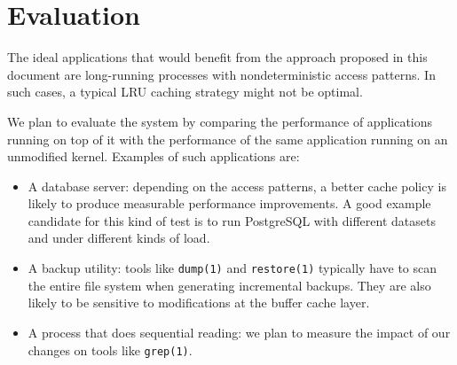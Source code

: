 \section{Evaluation}

The ideal applications that would benefit from the approach proposed in this document
are long-running processes with nondeterministic access patterns. In such cases,
a typical LRU caching strategy might not be optimal.

We plan to evaluate the system by comparing the performance of applications running
on top of it with the performance of the same application running on an unmodified
kernel. Examples of such applications are:

\begin{itemize}
\item A database server: depending on the access patterns, a better cache policy
is likely to produce measurable performance improvements. A good example candidate
for this kind of test is to run PostgreSQL with different datasets and under different
kinds of load.

\item A backup utility: tools like \texttt{dump(1)} and \texttt{restore(1)} typically
have to scan the entire file system when generating incremental backups. They are also
likely to be sensitive to modifications at the buffer cache layer.

\item A process that does sequential reading: we plan to measure the impact of our
changes on tools like \texttt{grep(1)}.
\end{itemize}
